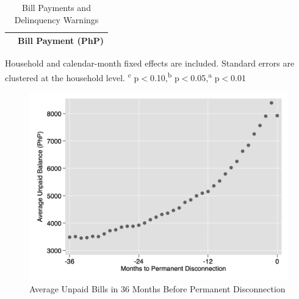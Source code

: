 \documentclass[12pt,table]{article}
\begin{document}
\begin{table}[!ht]
\small
\centering
\begin{threeparttable}
\caption{Bill Payments and Delinquency Warnings}\label{table:paywarning}
\vspace{-2mm}
\begin{tabular}{lc}
\toprule
 & \small Bill Payment (PhP) \\[.5em]
 \toprule

\bottomrule
\end{tabular}
\begin{tablenotes}
\footnotesize
\item Household and calendar-month fixed effects are included. Standard errors are clustered at the household level.  \textsuperscript{c} p$<$0.10,\textsuperscript{b} p$<$0.05,\textsuperscript{a} p$<$0.01 
\end{tablenotes}
\end{threeparttable}
\end{table}

\pagebreak



\begin{figure}[!ht]
\caption{Average Unpaid Bills in 36 Months Before Permanent Disconnection}\label{figure:billtodc}
\begin{center}
\includegraphics[scale=.4]{tables/pay_to_dc_graph.png}
\end{center}
\end{figure}
\end{document}
